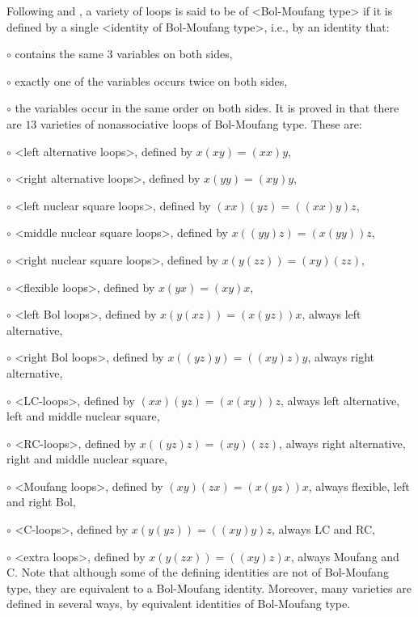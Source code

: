 Following \cite{Fe} and \cite{PhVo}, a variety of loops is said to be of
<Bol-Moufang type> if it is defined by a
single <identity of Bol-Moufang type>,
i.e., by an identity that:
\beginlist%
\item{$\circ$}
    contains the same $3$ variables on both sides,
\item{$\circ$}
     exactly one of the variables occurs twice on both sides,
\item{$\circ$}
     the variables occur in the same order on both sides.
\endlist
It is proved in \cite{PhVo} that there are $13$ varieties of nonassociative loops
of Bol-Moufang type. These are:
\beginlist%
\item{$\circ$}
    <left alternative loops>, defined by $x(xy) = (xx)y$,
\item{$\circ$}
    <right alternative loops>, defined by $x(yy) = (xy)y$,
\item{$\circ$}
    <left nuclear square loops>, defined by $(xx)(yz) = ((xx)y)z$,
\item{$\circ$}
    <middle nuclear square loops>, defined by $x((yy)z) = (x(yy))z$,
\item{$\circ$}
    <right nuclear square loops>, defined by $x(y(zz)) = (xy)(zz)$,
\item{$\circ$}
    <flexible loops>, defined by $x(yx) = (xy)x$,
\item{$\circ$}
    <left Bol loops>, defined by $x(y(xz)) = (x(yz))x$,
    always left alternative,
\item{$\circ$}
    <right Bol loops>, defined by $x((yz)y) = ((xy)z)y$,
    always right alternative,
\item{$\circ$}
    <LC-loops>, defined by $(xx)(yz) = (x(xy))z$,
    always left alternative, left and middle nuclear square,
\item{$\circ$}
    <RC-loops>, defined by $x((yz)z) = (xy)(zz)$,
    always right alternative, right and middle nuclear square,
\item{$\circ$}
    <Moufang loops>, defined by $(xy)(zx) = (x(yz))x$,
    always flexible, left and right Bol,
\item{$\circ$}
    <C-loops>, defined by $x(y(yz)) = ((xy)y)z$,
    always LC and RC,
\item{$\circ$}
    <extra loops>, defined by $x(y(zx)) = ((xy)z)x$,
    always Moufang and C.
\endlist
Note that although some of the defining identities are not of Bol-Moufang type,
they are equivalent to a Bol-Moufang identity. Moreover, many varieties are
defined in several ways, by equivalent identities of Bol-Moufang type.

